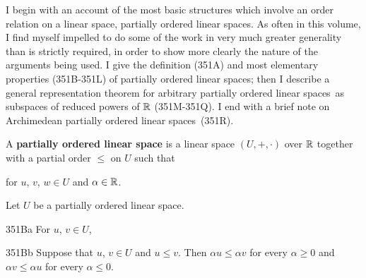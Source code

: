 
\def\chaptername{Riesz spaces}
\def\sectionname{Partially ordered linear spaces}
\def\pols{partially ordered linear space}
\def\polss{partially ordered linear spaces}


I begin with an account of the most basic structures which involve an
order relation on a linear space, \polss.   As often in this volume, I
find myself impelled to do some of the work in very much greater
generality than is strictly required, in order to show more clearly the
nature of the arguments being used.   I give the definition (351A) and
most elementary properties (351B-351L) of \polss;  then I describe a
general representation theorem for arbitrary \polss\ as subspaces of
reduced powers of $\Bbb R$ (351M-351Q).   I end with a brief note on
Archimedean \polss\ (351R).


   A {\bf \pols} is a linear space $(U,+,\cdot)$ over
$\Bbb R$ together with a partial order $\le$ on $U$ such that



\noindent for $u$, $v$, $w\in U$ and $\alpha\in\Bbb R$.

 Let $U$ be a \pols.  

\spheader 351Ba For $u$, $v\in U$,

{

}

\spheader 351Bb Suppose that $u$, $v\in U$ and $u\le v$.   Then
$\alpha u\le\alpha v$ for every $\alpha\ge 0$ and $\alpha v\le\alpha u$ for
every $\alpha\le 0$.   

